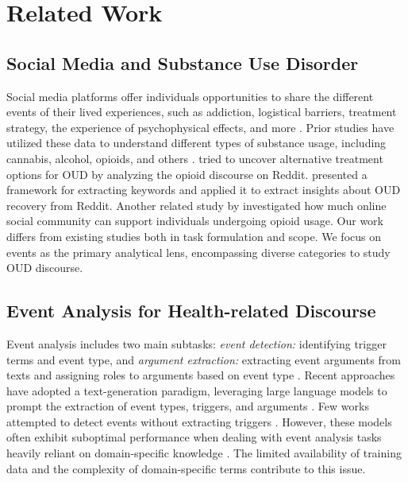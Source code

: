 \documentclass[letterpaper]{article}
\begin{document}
\section{Related Work}
\subsection{Social Media and Substance Use Disorder}
Social media platforms offer individuals opportunities to share the different events of their lived experiences, such as addiction, logistical barriers, treatment strategy, the experience of psychophysical effects, and more \cite{info:doi/10.2196/43349}. Prior studies have utilized these data to understand different types of substance usage, including cannabis, alcohol, opioids, and others \cite{Lavertu2021.04.01.21254815, CHEN2022100061}. \citeauthor{OpioidRecovery}  tried to uncover alternative treatment options for OUD by analyzing the opioid discourse on Reddit. \citeauthor{romano2023themedriven}  presented a framework for extracting keywords and applied it to extract insights about OUD recovery from Reddit. Another related study by   \citeauthor{Balsamo_Bajardi_De}  investigated how much online social community can support individuals undergoing opioid usage. Our work differs from existing studies both in task formulation and scope. We focus on events as the primary analytical lens, encompassing diverse categories to study OUD discourse.

\subsection{Event Analysis for Health-related Discourse}
Event analysis includes two main subtasks: \textit{event detection:} identifying trigger terms and event type, and \textit{argument extraction:} extracting event arguments from texts and assigning roles to arguments based on event type \cite{ma-etal-2023-dice}. %
Recent approaches have adopted a text-generation paradigm, leveraging large language models to prompt the extraction of event types, triggers, and arguments \cite{li-etal-2021-document,lu-etal-2021-text2event}. Few works attempted to detect events without extracting triggers \cite{liu-etal-2019-event}. However, these models often exhibit suboptimal performance when dealing with event analysis tasks heavily reliant on domain-specific knowledge \cite{li2023evaluating}. The limited availability of training data and the complexity of domain-specific terms contribute to this issue.
\end{document}
